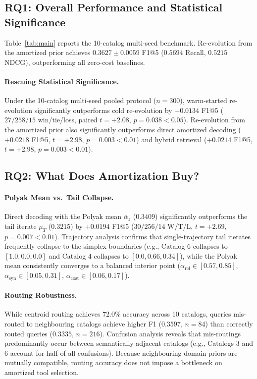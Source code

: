 \subsection{RQ1: Overall Performance and Statistical Significance}
\label{sec:exp_overall}



Table~\ref{tab:main} reports the 10-catalog multi-seed benchmark. Re-evolution from the amortized prior achieves $\mathbf{0.3627\pm0.0059}$ F1@5 ($0.5694$ Recall, $0.5215$ NDCG), outperforming all zero-cost baselines.

\paragraph{Rescuing Statistical Significance.}
Under the 10-catalog multi-seed pooled protocol ($n=300$), warm-started re-evolution significantly outperforms cold re-evolution by $+0.0134$ F1@5 ($27/258/15$ win/tie/loss, paired $t = +2.08$, $p = 0.038 < 0.05$). Re-evolution from the amortized prior also significantly outperforms direct amortized decoding ($+0.0218$ F1@5, $t = +2.98$, $p = 0.003 < 0.01$) and hybrid retrieval ($+0.0214$ F1@5, $t = +2.98$, $p = 0.003 < 0.01$).

\subsection{RQ2: What Does Amortization Buy?}
\label{sec:exp_amortization}

\paragraph{Polyak Mean vs.\ Tail Collapse.}
Direct decoding with the Polyak mean $\bar\alpha_z$ ($0.3409$) significantly outperforms the tail iterate $\mu_T$ ($0.3215$) by $+0.0194$ F1@5 ($30/256/14$ W/T/L, $t = +2.69$, $p = 0.007 < 0.01$). Trajectory analysis confirms that single-trajectory tail iterates frequently collapse to the simplex boundaries (e.g., Catalog 6 collapses to $[1.0, 0.0, 0.0]$ and Catalog 4 collapses to $[0.0, 0.66, 0.34]$), while the Polyak mean consistently converges to a balanced interior point ($\alpha_{\mathrm{rel}} \in [0.57, 0.85]$, $\alpha_{\mathrm{syn}} \in [0.05, 0.31]$, $\alpha_{\mathrm{cost}} \in [0.06, 0.17]$).

\paragraph{Routing Robustness.}
While centroid routing achieves $72.0\%$ accuracy across 10 catalogs, queries mis-routed to neighbouring catalogs achieve higher F1 ($0.3597$, $n=84$) than correctly routed queries ($0.3335$, $n=216$). Confusion analysis reveals that mis-routings predominantly occur between semantically adjacent catalogs (e.g., Catalogs 3 and 6 account for half of all confusions). Because neighbouring domain priors are mutually compatible, routing accuracy does not impose a bottleneck on amortized tool selection.

